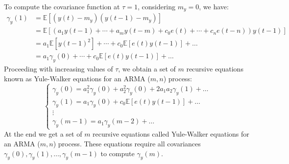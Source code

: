 To compute the covariance function at $\tau=1$, considering $m_y=0$, we have:
\begin{align*}
    \gamma_y(1) &=\mathbb{E}\left[ \left(y(t)-m_y\right)\left(y(t-1)-m_y\right) \right] \\
                &=\mathbb{E}\left[ \left(a_1y(t-1)+\cdots+a_m y(t-m)+c_0e(t)+\cdots+c_n e(t-n)\right)y(t-1) \right] \\
                &=a_1\mathbb{E}\left[{y(t-1)}^2\right]+\cdots+c_0\mathbb{E}\left[e(t)y(t-1)\right]+\dots \\
                &=a_1\gamma_y(0)+\cdots+c_0\mathbb{E}\left[e(t)y(t-1)\right]+\dots
\end{align*}
Proceeding with increasing values of $\tau$, we obtain a set of $m$ recursive equations known as Yule-Walker equations for an ARMA ($m,n$) process:
\[\begin{cases}
    \gamma_y(0)=a_1^2\gamma_y(0) +a_2^2\gamma_y(0) +2a_1a_2\gamma_y(1) +\dots \\
    \gamma_y(1)=a_1\gamma_y(0) +c_0\mathbb{E}\left[e(t)y(t-1)\right] +\dots \\
    \vdots \\
    \gamma_y(m-1)=a_1\gamma_y(m-2)+\dots
\end{cases}\]
At the end we get a set of $m$ recursive equations called Yule-Walker equations for an ARMA ($m,n$) process.
These equations require all covariances $\gamma_y(0),\gamma_y(1),\dots,\gamma_y(m-1)$ to compute $\gamma_y(m)$.
